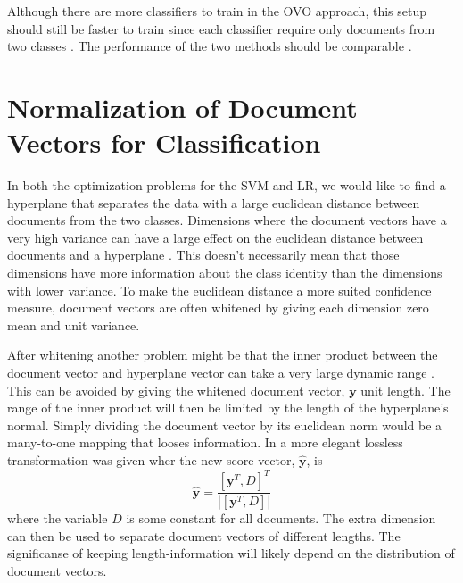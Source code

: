 Although there are more classifiers to train in the OVO approach, this setup should still be faster to train since each classifier require only documents from two classes \cite[832]{lidbok}. The performance of the two methods should be comparable \cite{Rifkin:2004:DOC:1005332.1005336}.

\section{Normalization of Document Vectors for Classification}
\label{sect:svmnormal}

In both the optimization problems for the SVM and LR, we would like to find a hyperplane that separates the data with a large euclidean distance between documents from the two classes. Dimensions where the document vectors have a very high variance can have a large effect on the euclidean distance between documents and a hyperplane \cite{wan2005speaker}. This doesn't necessarily mean that those dimensions have more information about the class identity than the dimensions with lower variance. To make the euclidean distance a more suited confidence measure, document vectors are often whitened by giving each dimension zero mean and unit variance. 

After whitening another problem might be that the inner product between the document vector and hyperplane vector can take a very large dynamic range \cite{wan2005speaker}. This can be avoided by giving the whitened document vector, $\mathbf{y}$ unit length. The range of the inner product will then be limited by the length of the hyperplane's normal. Simply dividing the document vector by its euclidean norm would be a many-to-one mapping that looses information. In \cite{wan2005speaker} a more elegant lossless transformation was given wher the new score vector, $\mathbf{\hat{y}}$, is
\begin{equation}
\label{svmnormalize}
\mathbf{\hat{y}} = \frac{[\mathbf{y}^T, D]^T}{|[\mathbf{y}^T, D]|}
\end{equation}
where the variable $D$ is some constant for all documents. The extra dimension can then be used to separate document vectors of different lengths. The significanse of keeping length-information will likely depend on the distribution of document vectors.